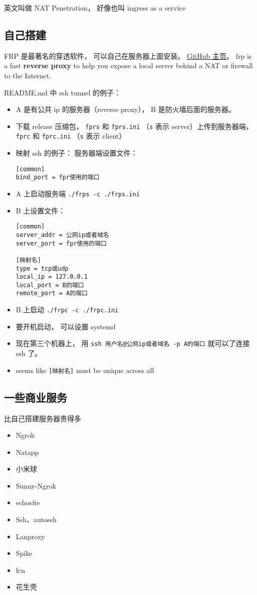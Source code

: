 
\begin{issues}
\issueDraft
\end{issues}

英文叫做 NAT Penetration， 好像也叫 ingress as a service

\subsection{自己搭建}
FRP 是最著名的穿透软件， 可以自己在服务器上面安装。 \href{https://github.com/fatedier/frp}{GitHub 主页}。
frp is a fast \textbf{reverse proxy} to help you expose a local server behind a NAT or firewall to the Internet.

README.md 中 ssh tunnel 的例子：
\begin{itemize}
\item A 是有公共 ip 的服务器（reverse proxy）， B 是防火墙后面的服务器。
\item 下载 release 压缩包， \verb|fprs| 和 \verb|fprs.ini| （\verb|s| 表示 server）上传到服务器端， \verb|fprc| 和 \verb|fprc.ini| （\verb|s| 表示 client）
\item 映射 ssh 的例子： 服务器端设置文件：
\begin{lstlisting}[language=none,caption=fprs.ini]
[common]
bind_port = fpr使用的端口
\end{lstlisting}
\item A 上启动服务端 \verb|./frps -c ./frps.ini|
\item B 上设置文件：
\begin{lstlisting}[language=none,caption=fprc.ini]
[common]
server_addr = 公网ip或者域名
server_port = fpr使用的端口

[映射名]
type = tcp或udp
local_ip = 127.0.0.1
local_port = B的端口
remote_port = A的端口
\end{lstlisting}
\item B 上启动 \verb|./frpc -c ./frpc.ini|
\item 要开机启动， 可以设置 systemd
\item 现在第三个机器上， 用 \verb|ssh 用户名@公网ip或者域名 -p A的端口| 就可以了连接 ssh 了。
\item seems like \verb|[映射名]| must be unique across all 
\end{itemize}

\subsection{一些商业服务}
比自己搭建服务器贵得多
\begin{itemize}
\item Ngrok
\item Natapp
\item 小米球
\item Sunny-Ngrok
\item echosite
\item Ssh、autossh
\item Lanproxy
\item Spike
\item fcn
\item 花生壳
\end{itemize}

